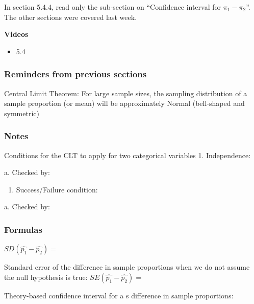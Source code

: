 \documentclass[
]{report}
\providecommand{\tightlist}{%
  \setlength{\itemsep}{0pt}\setlength{\parskip}{0pt}}
\newcommand{\rgs}{\vspace{12pt}} %
\newcommand{\rgi}{\hspace{24pt}}  %
\begin{document}
In section 5.4.4, read only the sub-section on ``Confidence interval for \(\pi_1 - \pi_2\)''. The other sections were covered last week.

\textbf{Videos}

\begin{itemize}
\tightlist
\item
  5.4
\end{itemize}


\hypertarget{reminders-from-previous-sections-6}{%
\subsubsection*{Reminders from previous sections}\label{reminders-from-previous-sections-6}}

Central Limit Theorem: For large sample sizes, the sampling distribution of a sample proportion (or mean) will be approximately Normal (bell-shaped and symmetric)

\hypertarget{notes-23}{%
\subsubsection*{Notes}\label{notes-23}}

Conditions for the CLT to apply for two categorical variables
1. Independence:
\rgs

\rgi a. Checked by:
\rgs

\begin{enumerate}
\def\labelenumi{\arabic{enumi}.}
\setcounter{enumi}{1}
\tightlist
\item
  Success/Failure condition:
  \rgs
\end{enumerate}

\rgi a. Checked by:
\rgs

\hypertarget{formulas-7}{%
\subsubsection*{Formulas}\label{formulas-7}}

\(SD(\hat{p_1} - \hat{p_2})=\)
\rgs

Standard error of the difference in sample proportions when we do not assume the null hypothesis is true:
\(SE(\hat{p_1} - \hat{p_2})=\)
\rgs

Theory-based confidence interval for a s difference in sample proportions:
\rgs
\end{document}
